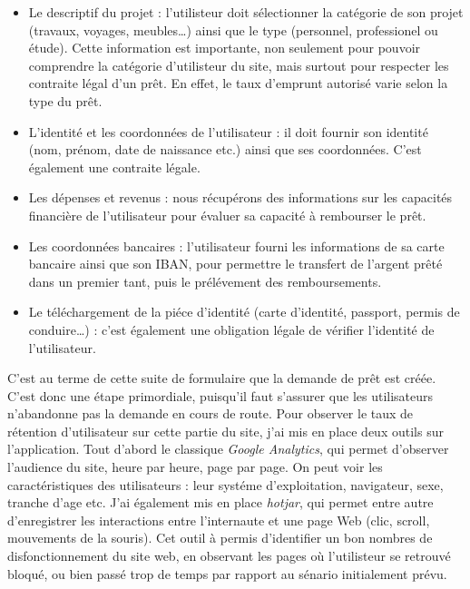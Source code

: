 \documentclass[12pt,a4paper]{article}
\providecommand{\tightlist}{%
  \setlength{\itemsep}{0pt}\setlength{\parskip}{0pt}}
\begin{document}
  \begin{itemize}
  \tightlist
  \item
    Le descriptif du projet : l'utilisteur doit sélectionner la catégorie
    de son projet (travaux, voyages, meubles\ldots{}) ainsi que le type
    (personnel, professionel ou étude). Cette information est importante,
    non seulement pour pouvoir comprendre la catégorie d'utilisteur du
    site, mais surtout pour respecter les contraite légal d'un prêt. En
    effet, le taux d'emprunt autorisé varie selon la type du prêt.
  \item
    L'identité et les coordonnées de l'utilisateur : il doit fournir son
    identité (nom, prénom, date de naissance etc.) ainsi que ses
    coordonnées. C'est également une contraite légale.
  \item
    Les dépenses et revenus : nous récupérons des informations sur les
    capacités financière de l'utilisateur pour évaluer sa capacité à
    rembourser le prêt.
  \item
    Les coordonnées bancaires : l'utilisateur fourni les informations de
    sa carte bancaire ainsi que son IBAN, pour permettre le transfert de
    l'argent prêté dans un premier tant, puis le prélévement des
    remboursements.
  \item
    Le téléchargement de la piéce d'identité (carte d'identité, passport,
    permis de conduire\ldots{}) : c'est également une obligation légale de
    vérifier l'identité de l'utilisateur.
  \end{itemize}

  \bigskip

  C'est au terme de cette suite de formulaire que la demande de prêt est
  créée. C'est donc une étape primordiale, puisqu'il faut s'assurer que
  les utilisateurs n'abandonne pas la demande en cours de route. Pour
  observer le taux de rétention d'utilisateur sur cette partie du site,
  j'ai mis en place deux outils sur l'application. Tout d'abord le
  classique \emph{Google Analytics}, qui permet d'observer l'audience du
  site, heure par heure, page par page. On peut voir les caractéristiques
  des utilisateurs : leur systéme d'exploitation, navigateur, sexe,
  tranche d'age etc. J'ai également mis en place \emph{hotjar}, qui permet
  entre autre d'enregistrer les interactions entre l'internaute et une
  page Web (clic, scroll, mouvements de la souris). Cet outil à permis
  d'identifier un bon nombres de disfonctionnement du site web, en
  observant les pages où l'utilisteur se retrouvé bloqué, ou bien passé
  trop de temps par rapport au sénario initialement prévu.
\end{document}
